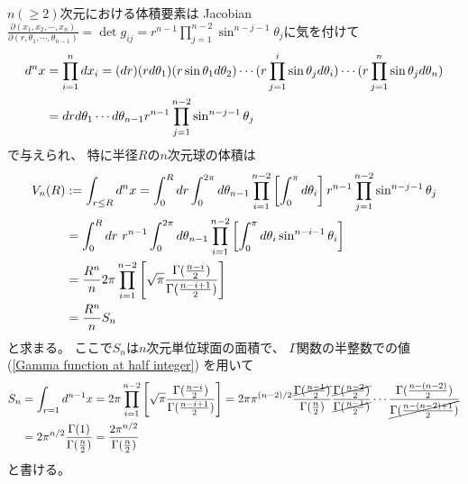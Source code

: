 $n (\ge 2)$次元における体積要素は
Jacobian
$\displaystyle
\frac{\partial(x_1, x_2, \cdots, x_n)}
    {\partial(r, \theta_1, \cdots, \theta_{n-1})}
=
    \det g_{ij}
=
    r^{n-1}
    \prod_{j = 1}^{n-2}
    \sin^{n - j - 1} \theta_j
$に気を付けて
\begin{align}
    d^n x
&=
    \prod_{i = 1}^n
    d x_i
=
    (dr)
    (r d \theta_1)
    (r \sin \theta_1 d \theta_2)
\cdots
    (r \prod_{j = 1}^i
    \sin \theta_j d \theta_i)
\cdots
    (r \prod_{j = 1}^n
    \sin \theta_j d \theta_n)
\notag\\&
=
    d r d \theta_1
        \cdots d \theta_{n-1}
    r^{n-1}
    \prod_{j = 1}^{n-2}
    \sin^{n - j - 1} \theta_j
\end{align}
で与えられ、
特に半径$R$の$n$次元球の体積は
\begin{align}
    V_n(R)
&:=
    \int_{r \le R} d^n x
=
    \int_0^R
        dr
    \int_0^{2 \pi}
        d \theta_{n-1}
    \prod_{i=1}^{n-2}
    \left[
        \int_0^{\pi}
            d \theta_i
    \right]
    r^{n-1}
    \prod_{j = 1}^{n-2}
    \sin^{n - j - 1} \theta_j
\notag\\&
=
    \int_0^R
        dr\ 
    r^{n-1}
    \int_0^{2 \pi}
        d \theta_{n-1}
    \prod_{i=1}^{n-2}
    \left[
        \int_0^{\pi}
            d \theta_i
        \sin^{n - i - 1} \theta_i
    \right]
\notag\\&
=
    \dfrac{R^n}{n}
    2 \pi
    \prod_{i=1}^{n-2}
    \left[
        \sqrt{\pi}
        \dfrac{\Gamma(\frac{n - i}{2})}
        {\Gamma(\frac{n - i + 1}{2})}
    \right]
\notag\\&
=
    \dfrac{R^n}{n}
    S_n
\end{align}
と求まる。
ここで$S_n$は$n$次元単位球面の面積で、
$\Gamma$関数の半整数での値
(\ref{Gamma function at half integer})
を用いて
\begin{align}
    S_n
&=
    \int_{r = 1}
        d^{n-1} x
=
    2 \pi
    \prod_{i=1}^{n-2}
    \left[
        \sqrt{\pi}
        \dfrac{\Gamma(\frac{n - i}{2})}
        {\Gamma(\frac{n - i + 1}{2})}
    \right]
=
    2 \pi
    \pi^{(n-2)/2}
    \dfrac{
        \cancel{
            \Gamma(\frac{n - 1}{2})
        }
    }
        {\Gamma(\frac{n}{2})}
    \dfrac{
        \cancel{
            \Gamma(\frac{n - 2}{2})
        }
    }
        {\cancel{
            \Gamma(\frac{n - 1}{2})
        }}
    \cdots
    \dfrac{\Gamma(\frac{n - (n-2)}{2})}
        {\cancel{
            \Gamma(\frac{n - (n-2) + 1}{2})
        }}
\notag\\&
=
    2
    \pi^{n/2}
    \dfrac{\Gamma(1)}
        {\Gamma(\frac{n}{2})}
=
    \dfrac{ 2 \pi^{n/2} }
        {\Gamma(\frac{n}{2})}
\label{surface area of n dimensional sphere}
\end{align}
と書ける。

